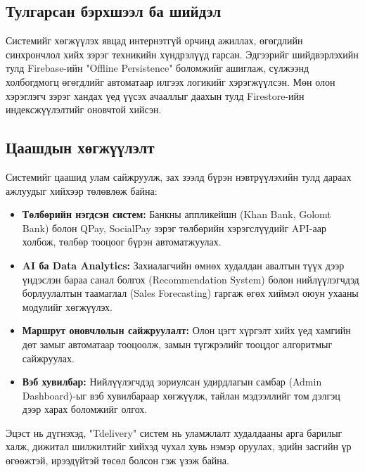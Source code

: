 \subsection{Тулгарсан бэрхшээл ба шийдэл}
Системийг хөгжүүлэх явцад интернэтгүй орчинд ажиллах, өгөгдлийн синхрончлол хийх зэрэг техникийн хүндрэлүүд гарсан. Эдгээрийг шийдвэрлэхийн тулд Firebase-ийн "Offline Persistence" боломжийг ашиглаж, сүлжээнд холбогдмогц өгөгдлийг автоматаар илгээх логикийг хэрэгжүүлсэн. Мөн олон хэрэглэгч зэрэг хандах үед үүсэх ачааллыг даахын тулд Firestore-ийн индексжүүлэлтийг оновчтой хийсэн.

\subsection{Цаашдын хөгжүүлэлт}
Системийг цаашид улам сайжруулж, зах зээлд бүрэн нэвтрүүлэхийн тулд дараах ажлуудыг хийхээр төлөвлөж байна:

\begin{itemize}
    \item \textbf{Төлбөрийн нэгдсэн систем:} Банкны аппликейшн (Khan Bank, Golomt Bank) болон QPay, SocialPay зэрэг төлбөрийн хэрэгслүүдийг API-аар холбож, төлбөр тооцоог бүрэн автоматжуулах.
    \item \textbf{AI ба Data Analytics:} Захиалагчийн өмнөх худалдан авалтын түүх дээр үндэслэн бараа санал болгох (Recommendation System) болон нийлүүлэгчдэд борлуулалтын таамаглал (Sales Forecasting) гаргаж өгөх хиймэл оюун ухааны модулийг хөгжүүлэх.
    \item \textbf{Маршрут оновчлолын сайжруулалт:} Олон цэгт хүргэлт хийх үед хамгийн дөт замыг автоматаар тооцоолж, замын түгжрэлийг тооцдог алгоритмыг сайжруулах.
    \item \textbf{Вэб хувилбар:} Нийлүүлэгчдэд зориулсан удирдлагын самбар (Admin Dashboard)-ыг вэб хувилбараар хөгжүүлж, тайлан мэдээллийг том дэлгэц дээр харах боломжийг олгох.
\end{itemize}

Эцэст нь дүгнэхэд, "Tdelivery" систем нь уламжлалт худалдааны арга барилыг халж, дижитал шилжилтийг хийхэд чухал хувь нэмэр оруулах, эдийн засгийн үр өгөөжтэй, ирээдүйтэй төсөл болсон гэж үзэж байна.

\vfill